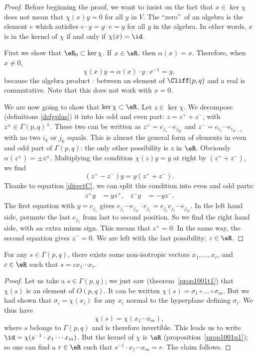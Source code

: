 \begin{proof}
	Before beginning the proof, we want to insist on the fact that $x\in \ker\chi$ does not mean that $\chi(x)y=0$ for all $y$ in $V$. The ``zero''\ of an algebra is the element $e$ which satisfies $e\cdot y=y\cdot e=y$ for all $y$ in the algebra. In other words, $x$ is in the kernel of $\chi$ if and only if $\chi(x)=\id$.

	First we show that $\eR_0\subset \ker\chi$. If $x\in \eR$, then $\alpha(x)=x$. Therefore, when $x\neq 0$,
	\[
		\chi(x)y=\alpha(x)\cdot y\cdot x^{-1}=y,
	\]
	because the algebra product $\cdot$ between an element of $\Cliff(p,q)$ and a real is commutative. Note that this does not work with $x=0$.

	We are now going to show that $\ker\chi\subset\eR$. Let $z\in\ker\chi$. We decompose (definitions \eqref{defgplus}) it into his odd and even part: $z=z^++z^-$, with $z^{\pm}\in\Gamma(p,q)^{\pm}$. These two can be written as $z^+=e_{j_1}\cdots e_{j_{2r}}$ and $z^-=e_{i_1}\cdots e_{i_{2r-1}}$ with no two $i_k$ or $j_k$ equals. This is almost the general form of elements in even and odd part of $\Gamma(p,q)$: the only other possibility is $z$ in $\eR$. Obviously $\alpha(z^{\pm})=\pm z^{\pm}$. Multiplying the condition $\chi(z)y=y$ at right by $(z^++z^-)$, we find \[(z^+-z^-)y=y(z^++z^-).\] Thanks to equation \eqref{directC}, we can split this condition into even and odd parts:
	\begin{align}
		z^+y & =yz^+,
		     & z^-y   & =-yz^-.
	\end{align}
	The first equation with $y=e_{j_1}$ gives $e_{j_1}\cdots e_{j_{2r}}\cdot e_{j_1}=e_{j_1}e_{j_1}\cdots e_{j_{2r}}$. In the left hand side, permute the last $e_{j_1}$ from last to second position. So we find the right hand side, with an extra minus sign. This means that $z^+=0$. In the same way, the second equation gives $z^-=0$. We are left with the last possibility: $z\in\eR$.
\end{proof}

\begin{corollary}
	For any $s\in\Gamma(p,q)$, there exists some non-isotropic vectors $x_1,\ldots,x_r$, and $c\in\eR$ such that $s=cx_1\cdots x_r$.
	\label{602c1}
\end{corollary}

\begin{proof}
	Let us take a $s\in\Gamma(p,q)$; we just saw (theorem~\ref{prop1001t1}) that $\chi(s)$ is an element of $O(p,q)$. It can be written $\chi(s)=\sigma_1\circ\ldots\circ\sigma_m$. But we had shown that $\sigma_i=\chi(x_i)$ for any $x_i$ normal to the hyperplane defining $\sigma_i$. We thus have
	\[
		\chi(s)=\chi(x_1\cdots x_m),
	\]
	where $s$ belongs to $\Gamma(p,q)$ and is therefore invertible. This leads us to write $\id=\chi(s^{-1}\cdot x_1\cdots x_m)$. But the kernel of $\chi$ is $\eR$ (proposition~\ref{prop1001p1}); so one can find a $r\in\eR$ such that $s^{-1}\cdot x_1\cdots x_m=r$. The claim follows.
\end{proof}

